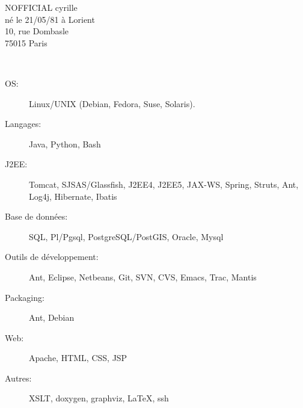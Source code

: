 \documentclass[11pt, oneside, a4paper, french]{article}
\begin{document}
\pagestyle{fancy}


      
\vspace{-5cm} 

\parbox[l]{9cm}{
  NOFFICIAL cyrille\\
  n\'e le 21/05/81 \`a Lorient\\
  
  10, rue Dombasle\\
  75015 Paris\\
}  


\vspace{1cm}
\begin{center}
\end{center}
\vspace{1cm}

\textbf{
  \Large{
  }
}\\
\begin{description}
\item[OS:] Linux/UNIX (Debian, Fedora, Suse, Solaris).
\item[Langages:] Java, Python, Bash
\item[J2EE:] Tomcat, SJSAS/Glassfish, J2EE4, J2EE5,
JAX-WS, Spring, Struts, Ant, Log4j, Hibernate, Ibatis
\item[Base de donn\'ees:] SQL, Pl/Pgsql, PostgreSQL/PostGIS, Oracle, Mysql
\item[Outils de d\'eveloppement:] Ant, Eclipse, Netbeans, Git, SVN, CVS, Emacs, Trac, Mantis
\item[Packaging:] Ant, Debian
\item[Web:] Apache, HTML, CSS, JSP
\item[Autres:] XSLT, doxygen, graphviz, \LaTeX, ssh
\end{description}
\end{document}
